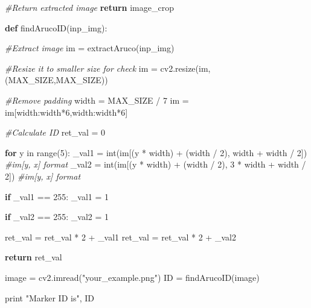 \documentclass[]{article}
\newenvironment{Shaded}{}{}
\newcommand{\KeywordTok}[1]{\textcolor[rgb]{0.00,0.44,0.13}{\textbf{{#1}}}}
\newcommand{\DecValTok}[1]{\textcolor[rgb]{0.25,0.63,0.44}{{#1}}}
\newcommand{\StringTok}[1]{\textcolor[rgb]{0.25,0.44,0.63}{{#1}}}
\newcommand{\CommentTok}[1]{\textcolor[rgb]{0.38,0.63,0.69}{\textit{{#1}}}}
\newcommand{\ControlFlowTok}[1]{\textcolor[rgb]{0.00,0.44,0.13}{\textbf{{#1}}}}
\newcommand{\OperatorTok}[1]{\textcolor[rgb]{0.40,0.40,0.40}{{#1}}}
\newcommand{\BuiltInTok}[1]{{#1}}
\newcommand{\NormalTok}[1]{{#1}}
\begin{document}
\begin{Shaded}
\begin{Highlighting}[]
    \CommentTok{#Return extracted image}
    \ControlFlowTok{return} \NormalTok{image_crop}


\KeywordTok{def} \NormalTok{findArucoID(inp_img):}

    \CommentTok{#Extract image}
    \NormalTok{im }\OperatorTok{=} \NormalTok{extractAruco(inp_img)}

    \CommentTok{#Resize it to smaller size for check}
    \NormalTok{im }\OperatorTok{=} \NormalTok{cv2.resize(im, (MAX_SIZE,MAX_SIZE))}

    \CommentTok{#Remove padding}
    \NormalTok{width }\OperatorTok{=} \NormalTok{MAX_SIZE }\OperatorTok{/} \DecValTok{7}
    \NormalTok{im }\OperatorTok{=} \NormalTok{im[width:width}\OperatorTok{*}\DecValTok{6}\NormalTok{,width:width}\OperatorTok{*}\DecValTok{6}\NormalTok{]}

    \CommentTok{#Calculate ID}
    \NormalTok{ret_val }\OperatorTok{=} \DecValTok{0}
    
    \ControlFlowTok{for} \NormalTok{y }\OperatorTok{in} \BuiltInTok{range}\NormalTok{(}\DecValTok{5}\NormalTok{):}
        \NormalTok{_val1 }\OperatorTok{=} \BuiltInTok{int}\NormalTok{(im[(y }\OperatorTok{*} \NormalTok{width) }\OperatorTok{+}  \NormalTok{(width }\OperatorTok{/} \DecValTok{2}\NormalTok{), width }\OperatorTok{+} \NormalTok{width }\OperatorTok{/} \DecValTok{2}\NormalTok{]) }\CommentTok{#im[y, x] format}
        \NormalTok{_val2 }\OperatorTok{=} \BuiltInTok{int}\NormalTok{(im[(y }\OperatorTok{*} \NormalTok{width) }\OperatorTok{+}  \NormalTok{(width }\OperatorTok{/} \DecValTok{2}\NormalTok{), }\DecValTok{3} \OperatorTok{*} \NormalTok{width }\OperatorTok{+} \NormalTok{width }\OperatorTok{/} \DecValTok{2}\NormalTok{]) }\CommentTok{#im[y, x] format}

        \ControlFlowTok{if} \NormalTok{_val1 }\OperatorTok{==} \DecValTok{255}\NormalTok{:}
            \NormalTok{_val1 }\OperatorTok{=} \DecValTok{1}

        \ControlFlowTok{if} \NormalTok{_val2 }\OperatorTok{==} \DecValTok{255}\NormalTok{:}
            \NormalTok{_val2 }\OperatorTok{=} \DecValTok{1}

        
        \NormalTok{ret_val }\OperatorTok{=} \NormalTok{ret_val }\OperatorTok{*} \DecValTok{2} \OperatorTok{+} \NormalTok{_val1}
        \NormalTok{ret_val }\OperatorTok{=} \NormalTok{ret_val }\OperatorTok{*} \DecValTok{2} \OperatorTok{+} \NormalTok{_val2}

    \ControlFlowTok{return} \NormalTok{ret_val}
        


\NormalTok{image }\OperatorTok{=} \NormalTok{cv2.imread(}\StringTok{"your_example.png"}\NormalTok{)}
\NormalTok{ID }\OperatorTok{=} \NormalTok{findArucoID(image)}

\BuiltInTok{print} \StringTok{"Marker ID is"}\NormalTok{, ID}
\end{Highlighting}
\end{Shaded}
\end{document}
